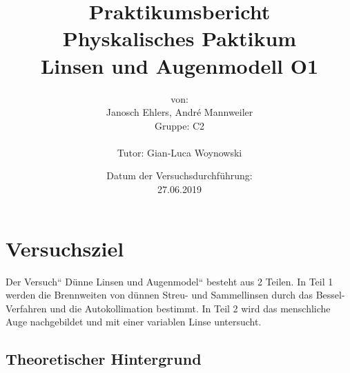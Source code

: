 \documentclass[a4paper, 12pt]{article}
\begin{document}
	\title{Praktikumsbericht\\Physkalisches Paktikum\\Linsen und Augenmodell O1}
	\author{von:\\Janosch Ehlers, André Mannweiler\\Gruppe: C2\\\\Tutor: Gian-Luca Woynowski}
	\date{Datum der Versuchsdurchführung:\\ 27.06.2019}
	\maketitle
	\thispagestyle{empty}
\newpage
	\clearpage
\section{Versuchsziel}
	Der Versuch“ Dünne Linsen und Augenmodel“ besteht aus 2 Teilen. In Teil 1 werden die Brennweiten von dünnen Streu- und Sammellinsen durch das Bessel-Verfahren und die Autokollimation bestimmt. In Teil 2 wird das menschliche Auge nachgebildet und mit einer variablen Linse untersucht.

\subsection{Theoretischer Hintergrund}
\end{document}
